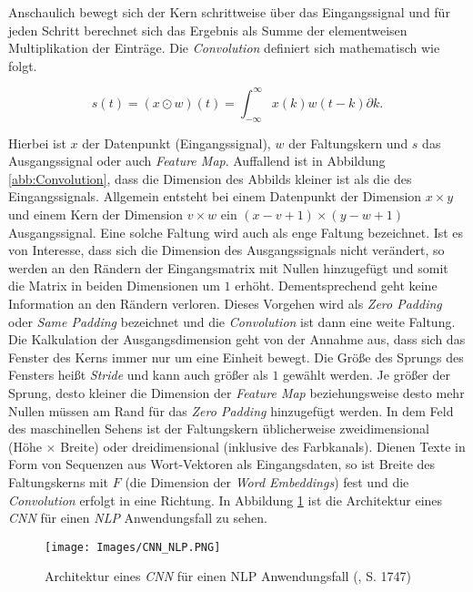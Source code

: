 \documentclass[a4paper,11pt]{article}
\begin{document}
Anschaulich bewegt sich der Kern schrittweise über das Eingangssignal und für jeden Schritt berechnet sich das Ergebnis als Summe der elementweisen Multiplikation der Einträge. Die \textit{Convolution} definiert sich mathematisch wie folgt.

\[s(t) = (x \odot w)(t) =  \int_{- \infty}^{\infty} x(k)w(t-k) \partial k  .\]

Hierbei ist $x$ der Datenpunkt (Eingangssignal), $w$ der Faltungskern und $s$ das Ausgangssignal oder auch \textit{Feature Map}. Auffallend ist in Abbildung \ref{abb:Convolution}, dass die Dimension des Abbilds kleiner ist als die des Eingangssignals. Allgemein entsteht bei einem Datenpunkt der Dimension $x \times y$ und einem Kern der Dimension $v \times w$ ein $(x-v + 1) \times (y - w +1)$ Ausgangssignal. Eine solche Faltung wird auch als enge Faltung bezeichnet. Ist es von Interesse, dass sich die Dimension des Ausgangssignals nicht verändert, so werden an den Rändern der Eingangsmatrix mit Nullen hinzugefügt und somit die Matrix in beiden Dimensionen um $1$ erhöht. Dementsprechend geht keine Information an den Rändern verloren. Dieses Vorgehen wird als \textit{Zero Padding} oder \textit{Same Padding} bezeichnet und die \textit{Convolution} ist dann eine weite Faltung. Die Kalkulation der Ausgangsdimension geht von der Annahme aus, dass sich das Fenster des Kerns immer nur um eine Einheit bewegt. Die Größe des Sprungs des Fensters heißt \textit{Stride} und kann auch größer als $1$ gewählt werden. Je größer der Sprung, desto kleiner die Dimension der \textit{Feature Map} beziehungsweise desto mehr Nullen müssen am Rand für das \textit{Zero Padding} hinzugefügt werden. In dem Feld des maschinellen Sehens ist der Faltungskern üblicherweise zweidimensional (Höhe $\times$ Breite) oder dreidimensional (inklusive des Farbkanals). Dienen Texte in Form von Sequenzen aus Wort-Vektoren als Eingangsdaten, so ist Breite des Faltungskerns mit $F$ (die Dimension der \textit{Word Embeddings}) fest und die \textit{Convolution} erfolgt in eine Richtung. In Abbildung \ref{abb:CNN_NLP} ist die Architektur eines \textit{CNN} für einen \textit{NLP} Anwendungsfall zu sehen.

\begin{figure}[!ht]
\begin{center}
\texttt{[image: Images/CNN\_NLP.PNG]}
\caption{Architektur eines \textit{CNN} für einen NLP Anwendungsfall (\cite{cnnSentence}, S. 1747)}
\label{abb:CNN_NLP}
\end{center}
\end{figure}
\end{document}
